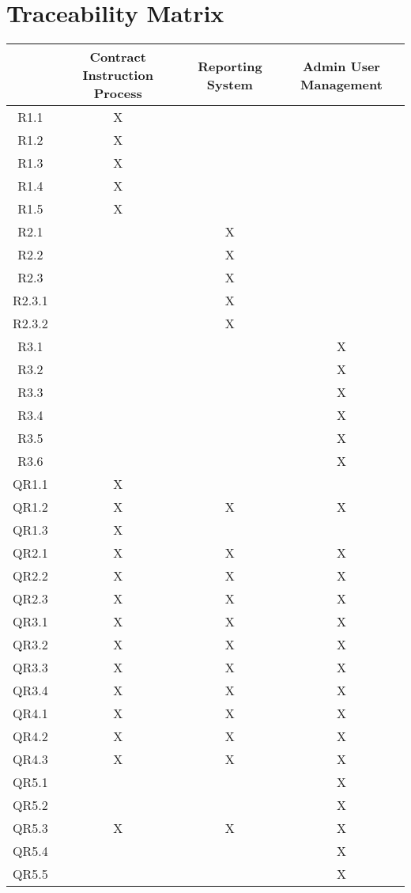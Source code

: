 \documentclass[11pt]{article}
\begin{document}
\section{Traceability Matrix}
\begin{center}
 \begin{tabular}{||c | c | c | c ||} 
 \hline
  & Contract Instruction Process & Reporting System & Admin User Management \\
 \hline\hline
 R1.1 & X &  &  \\
 \hline
 R1.2 & X &  &  \\
 \hline
 R1.3 & X &  &  \\
 \hline
 R1.4 & X &  &  \\
 \hline
 R1.5 & X &  &  \\
 \hline
 R2.1 &  & X &  \\
 \hline
 R2.2 &  & X &  \\
 \hline
 R2.3 &  & X &  \\
 \hline
 R2.3.1 &  & X &  \\
 \hline
 R2.3.2 &  & X &  \\
 \hline
 R3.1 &  &  & X \\
 \hline
 R3.2 &  &  & X \\
 \hline
 R3.3 &  &  & X \\
 \hline
 R3.4 &  &  & X \\
 \hline
 R3.5 &  &  & X \\
 \hline
 R3.6 &  &  & X \\
 \hline
 QR1.1 & X &  & \\
 \hline
 QR1.2 & X & X & X \\
 \hline
 QR1.3 & X &  & \\
 \hline
 QR2.1 & X & X & X \\
 \hline
 QR2.2 & X & X & X \\
 \hline
 QR2.3 & X & X & X \\
 \hline
 QR3.1 & X & X & X \\
 \hline
 QR3.2 & X & X & X \\
 \hline
 QR3.3 & X & X & X \\
 \hline
 QR3.4 & X & X & X \\
 \hline
 QR4.1 & X & X & X \\
 \hline
 QR4.2 & X & X & X \\
 \hline
 QR4.3 & X & X & X \\
 \hline
 QR5.1 &  &  & X \\
 \hline
 QR5.2 &  &  & X \\
 \hline
 QR5.3 & X & X & X \\
 \hline
 QR5.4 &  &  & X \\
 \hline
 QR5.5 &  &  & X \\
 \hline

\end{tabular}
\end{center}
\end{document}
